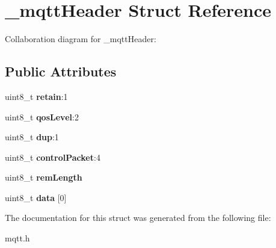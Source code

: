 \hypertarget{struct__mqttHeader}{}\section{\+\_\+mqtt\+Header Struct Reference}
\label{struct__mqttHeader}


Collaboration diagram for \+\_\+mqtt\+Header\+:
\subsection*{Public Attributes}
\begin{DoxyCompactItemize}
\item 
\mbox{\label{struct__mqttHeader_a4bb9f2efb2fad66697a49ca223404707}} 
uint8\+\_\+t {\bfseries retain}\+:1
\item 
\mbox{\label{struct__mqttHeader_ad1968d139e05f0dbb0deeaffbe44200d}} 
uint8\+\_\+t {\bfseries qos\+Level}\+:2
\item 
\mbox{\label{struct__mqttHeader_aaf6dd4ab86a9a77df65f661b7c2eb6a3}} 
uint8\+\_\+t {\bfseries dup}\+:1
\item 
\mbox{\label{struct__mqttHeader_a81bf12c5a9d678f05619fa5b3d917516}} 
uint8\+\_\+t {\bfseries control\+Packet}\+:4
\item 
\mbox{\label{struct__mqttHeader_ab2a0ef860aab83b8ac76bc9fe9d3cfe5}} 
uint8\+\_\+t {\bfseries rem\+Length}
\item 
\mbox{\label{struct__mqttHeader_a210631612026cc00977602020ff7cf26}} 
uint8\+\_\+t {\bfseries data} \mbox{[}0\mbox{]}
\end{DoxyCompactItemize}


The documentation for this struct was generated from the following file\+:\begin{DoxyCompactItemize}
\item 
mqtt.\+h\end{DoxyCompactItemize}
